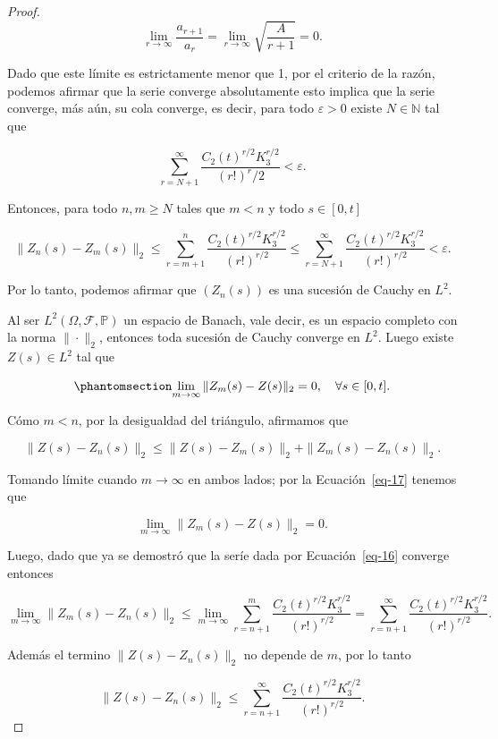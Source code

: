 \documentclass[
  spanish,
  us-letterpaper,
]{scrreprt}
\theoremstyle{plain}
\theoremstyle{plain}
\theoremstyle{plain}
\theoremstyle{definition}
\theoremstyle{remark}
\begin{document}
\begin{proof}
\[
\lim\limits_{r\rightarrow\infty}\frac{a_{r+1}}{a_r}=\lim\limits_{r\rightarrow\infty}\sqrt{\frac{A}{r+1}}=0.
\]

Dado que este límite es estrictamente menor que 1, por el criterio de la
razón, podemos afirmar que la serie converge absolutamente esto implica
que la serie converge, más aún, su cola converge, es decir, para todo
\(\varepsilon>0\) existe \(N\in \mathbb{N}\) tal que

\[
    \sum\limits_{r=N+1}^{\infty}\frac{C_2(t)^{r/2}K_3^{r/2}}{(r!)^r/2}<\varepsilon.
\]

Entonces, para todo \(n,m\geq N\) tales que \(m<n\) y todo
\(s\in [0,t]\)

\[
    \|Z_n(s)-Z_m(s)\|_2\leq \sum\limits_{r=m+1}^n\frac{C_2(t)^{r/2}K_3^{r/2}}{(r!)^{r/2}}\leq \sum\limits_{r=N+1}^{\infty} \frac{C_2(t)^{r/2}K_3^{r/2}}{(r!)^{r/2}}<\varepsilon.
\]

Por lo tanto, podemos afirmar que \((Z_n(s))\) es una sucesión de Cauchy
en \(L^2\).

Al ser \(L^2(\Omega, \mathcal{F},\mathbb{P})\) un espacio de Banach,
vale decir, es un espacio completo con la norma \(\|\cdot\|_2\),
entonces toda sucesión de Cauchy converge en \(L^2\). Luego existe
\(Z(s)\in L^2\) tal que

\begin{equation}\phantomsection\label{eq-17}{
    \lim\limits_{m\rightarrow \infty}\|Z_m(s)-Z(s)\|_2=0, \ \ \ \forall s\in [0,t].
}\end{equation}

Cómo \(m<n\), por la desigualdad del triángulo, afirmamos que

\[
    \|Z(s)-Z_n(s)\|_2\leq \|Z(s)-Z_m(s)\|_2+\|Z_m(s)-Z_n(s)\|_2.
\]

Tomando límite cuando \(m\rightarrow\infty\) en ambos lados; por la
Ecuación~\ref{eq-17} tenemos que

\[
    \lim\limits_{m\rightarrow \infty}\|Z_m(s)-Z(s)\|_2=0.
\]

Luego, dado que ya se demostró que la seríe dada por
Ecuación~\ref{eq-16} converge entonces

\[
    \lim\limits_{m\rightarrow\infty} \|Z_m(s)-Z_n(s)\|_2\leq \lim\limits_{m\rightarrow\infty}\sum\limits_{r=n+1}^m\frac{C_2(t)^{r/2}K_3^{r/2}}{(r!)^{r/2}}=\sum\limits_{r=n+1}^{\infty}\frac{C_2(t)^{r/2}K_3^{r/2}}{(r!)^{r/2}}.
\]

Además el termino \(\|Z(s)-Z_n(s)\|_2\) no depende de \(m\), por lo
tanto

\[
    \|Z(s)-Z_n(s)\|_2\leq \sum\limits_{r=n+1}^{\infty}\frac{C_2(t)^{r/2}K_3^{r/2}}{(r!)^{r/2}}.
\]


\end{proof}
\end{document}
